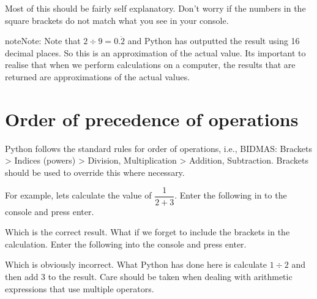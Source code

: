 \documentclass[letterpaper,10pt,english]{jupyterBook}
\begin{document}
\sphinxAtStartPar
Most of this should be fairly self explanatory. Don’t worry if the numbers in the square brackets do not match what you see in your console.

\begin{sphinxadmonition}{note}{Note:}
\sphinxAtStartPar
Note that \(2 \div 9 = 0.\dot{2}\) and Python has outputted the result using 16 decimal places. So this is an approximation of the actual value. Its important to realise that when we perform calculations on a computer, the results that are returned are approximations of the actual values.
\end{sphinxadmonition}


\part{Order of precedence of operations}
\label{\detokenize{_pages/1.1_Basic_arithmetic_operations:order-of-precedence-of-operations}}
\sphinxAtStartPar
Python follows the standard rules for order of operations, i.e., BIDMAS: Brackets > Indices (powers) > Division, Multiplication > Addition, Subtraction. Brackets should be used to override this where necessary.

\sphinxAtStartPar
For example, lets calculate the value of \(\dfrac{1}{2+3}\). Enter the following in to the console and press enter.

\begin{sphinxVerbatim}[commandchars=\\\{\}]
 \PYG{p}{[}\PYG{p}{]}     
\PYG{p}{[}\PYG{p}{]} 
\end{sphinxVerbatim}

\sphinxAtStartPar
Which is the correct result. What if we forget to include the brackets in the calculation. Enter the following into the console and press enter.

\begin{sphinxVerbatim}[commandchars=\\\{\}]
 \PYG{p}{[}\PYG{p}{]}     
\PYG{p}{[}\PYG{p}{]} 
\end{sphinxVerbatim}

\sphinxAtStartPar
Which is obviously incorrect. What Python has done here is calculate \(1 \div 2\) and then add 3 to the result. Care should be taken when dealing with arithmetic expressions that use multiple operators.
\end{document}
